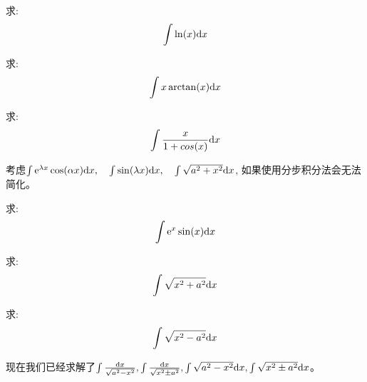 \begin{example}
    求:
    \begin{equation*}
        \int \ln(x) \mathrm{d} x
    \end{equation*}
\end{example}
\begin{solution}
    
\end{solution}

\begin{example}
    求:
    \begin{equation*}
        \int x\arctan(x) \mathrm{d} x
    \end{equation*}
\end{example}
\begin{solution}
    
\end{solution}

\begin{example}
    求:
    \begin{equation*}
        \int \frac{x}{1+cos(x)} \mathrm{d} x
    \end{equation*}
\end{example}
\begin{solution}
    
\end{solution}
考虑$\int \mathrm{e}^{\lambda x} \cos(\alpha x) \mathrm{d} x, \quad \int \sin(\lambda x) \mathrm{d} x, \quad \int \sqrt{a^2 + x^2} \mathrm{d} x$, 如果使用分步积分法会无法简化。
\begin{example}
    求:
    \begin{equation*}
        \int \mathrm{e}^x \sin(x) \mathrm{d} x
    \end{equation*}
\end{example}
\begin{solution}
    
\end{solution}

\begin{example}
    求:
    \begin{equation*}
        \int \sqrt{x^2+a^2} \mathrm{d} x
    \end{equation*}
\end{example}
\begin{solution}
    
\end{solution}

\begin{example}
    求:
    \begin{equation*}
        \int \sqrt{x^2-a^2} \mathrm{d} x
    \end{equation*}
\end{example}
\begin{solution}
    
\end{solution}
\begin{remark}
    现在我们已经求解了$\int \frac{\mathrm{d} x}{\sqrt{a^2-x^2}}, \int \frac{\mathrm{d} x}{\sqrt{x^2 \pm a^2}}, \int \sqrt{a^2-x^2} \mathrm{d} x, \int \sqrt{x^2\pm a^2} \mathrm{d} x$。
\end{remark}